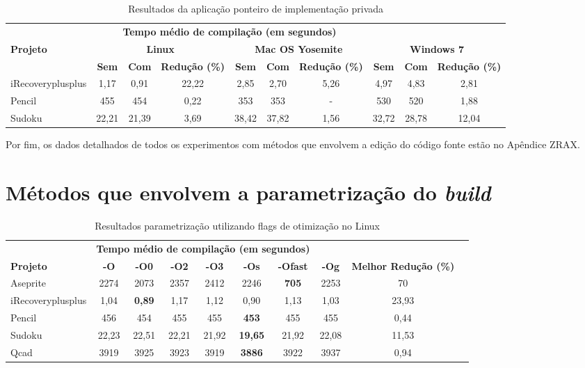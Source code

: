 \begin{table}[!ht]
\tiny
\centering
\caption{Resultados da aplicação ponteiro de implementação privada }
\label{tab:pimpl}
\begin{tabular}{lccccccccc}
& \multicolumn{6}{c}{\textbf{Tempo médio de compilação (em segundos)} } \\
\textbf{Projeto} & \multicolumn{3}{c}{\textbf{Linux}} & \multicolumn{3}{c}{\textbf{Mac OS Yosemite}} & \multicolumn{3}{c}{\textbf{Windows 7}} \\ 
& \textbf{Sem } & \textbf{Com }  & \textbf{Redução (\%)} & \textbf{Sem } & \textbf{Com }  & \textbf{Redução (\%)} & \textbf{Sem } & \textbf{Com }  & \textbf{Redução (\%)} \\
\toprule
iRecoveryplusplus  &   1,17   &  0,91   & 22,22   & 2,85  & 2,70   & 5,26  & 4,97 & 4,83 & 2,81 \\ 
Pencil             &   455    &  454    & 0,22    & 353   & 353    & -     & 530 & 520   & 1,88 \\
Sudoku             &   22,21  & 21,39   & 3,69    & 38,42 & 37,82  & 1,56  & 32,72 & 28,78 & 12,04 \\ 
\end{tabular}
\end{table}

Por fim, os dados detalhados de todos os experimentos com métodos que envolvem a edição do código fonte estão no Apêndice ZRAX.

\section{Métodos que envolvem a parametrização do \textit{build}}


\begin{table}[!ht]
\tiny
\centering
\caption{Resultados parametrização utilizando flags de otimização no Linux}
\label{tab:flags_otimizacao:linux}
\begin{tabular}{lccccccccc}
& \multicolumn{6}{c}{\textbf{Tempo médio de compilação (em segundos)} } \\
 \textbf{Projeto}& \textbf{-O}  & \textbf{-O0}   & \textbf{-O2} & \textbf{-O3} & \textbf{-Os} & \textbf{-Ofast} & \textbf{-Og} & \textbf{Melhor Redução (\%)}\\ \toprule
Aseprite  & 2274 & 2073  & 2357 & 2412 & 2246 & \textbf{705} & 2253 & 70 \\
iRecoveryplusplus   & 1,04 & \textbf{0,89} &  1,17 & 1,12 & 0,90 & 1,13 & 1,03 & 23,93 \\
Pencil  & 456 & 454 &  455 & 455 & \textbf{453} & 455 & 455 & 0,44\\
Sudoku  & 22,23  & 22,51  & 22,21 & 21,92 & \textbf{19,65} & 21,92 & 22,08 &  11,53 \\ 
Qcad    & 3919 &  3925 &  3923 & 3919 & \textbf{3886} & 3922 & 3937 & 0,94  \\ 
\end{tabular}
\end{table}


